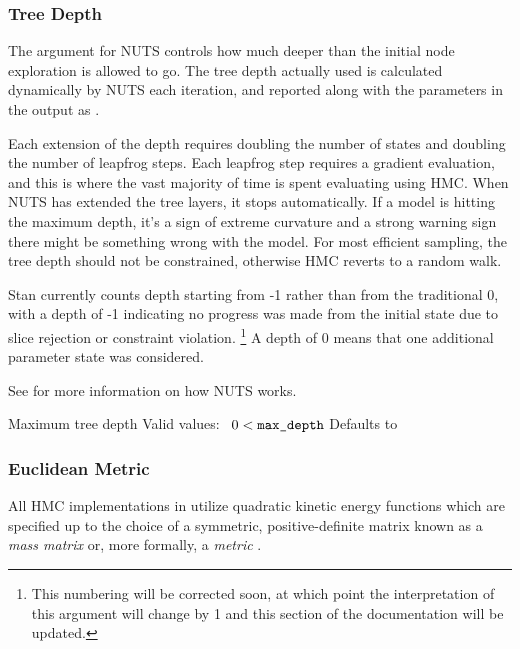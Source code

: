 \subsubsection{Tree Depth}

The  argument for NUTS controls how much deeper than
the initial node exploration is allowed to go.  The tree depth
actually used is calculated dynamically by NUTS each iteration, and
reported along with the parameters in the output as
.

Each extension of the depth requires doubling the number of states and
doubling the number of leapfrog steps.  Each leapfrog step requires a
gradient evaluation, and this is where the vast majority of time is
spent evaluating using HMC.  When NUTS has extended the tree
 layers, it stops automatically.  If a model is
hitting the maximum depth, it's a sign of extreme curvature and a
strong warning sign there might be something wrong with the model.
For most efficient sampling, the tree depth should not be constrained,
otherwise HMC reverts to a random walk.

Stan currently counts depth starting from -1 rather than
from the traditional 0, with a depth of -1 indicating no progress was
made from the initial state due to slice rejection or constraint
violation.  
%
\footnote{This numbering will be corrected soon, at which point the
  interpretation of this argument will change by 1 and this section of
  the documentation will be updated.}
%
A depth of 0 means that one additional parameter state was considered.

See \citep{Hoffman-Gelman:2011, Hoffman-Gelman:2013} for more
information on how NUTS works.

\begin{description}
              {Maximum tree depth}
              {Valid values: \  $0 < \mbox{\code{max\_depth}}$}
              {Defaults to }
%
\end{description}
%



\subsubsection{Euclidean Metric}

All HMC implementations in \Stan utilize quadratic kinetic energy
functions which are specified up to the choice of a symmetric,
positive-definite matrix known as a \textit{mass matrix} or, more
formally, a \textit{metric} \citep{Betancourt-Stein:2011}.


